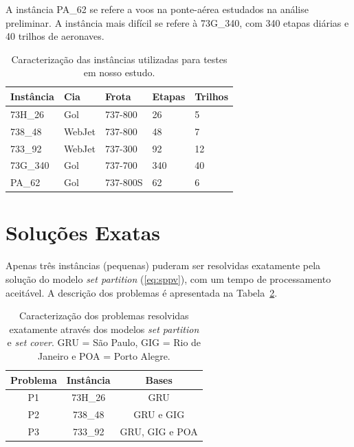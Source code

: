 A instância PA\_62 se refere a voos na ponte-aérea estudados na análise preliminar. A instância mais
difícil se refere à 73G\_340, com 340 etapas diárias e 40 trilhos de aeronaves.

\begin{table}[htb]
	\begin{center} 
		\begin{tabular}{|l|l|l|l|l|}
			\hline 
			{\bf Instância} & {\bf Cia} & {\bf Frota} & {\bf Etapas} & {\bf Trilhos} \\ 
			\hline \hline
			73H\_26 & Gol & 737-800 & 26 & 5 \\ 
			738\_48 & WebJet & 737-800 & 48 & 7 \\ 
			733\_92 & WebJet & 737-300 & 92 & 12 \\
			73G\_340 & Gol & 737-700 & 340 & 40 \\
			PA\_62 & Gol & 737-800S & 62 & 6 \\ \hline
		\end{tabular}
		\caption{Caracterização das instâncias utilizadas para testes em nosso estudo.}
		\label{tab:instancias}
	\end{center}
\end{table}


\section{Soluções Exatas}
\label{sec:solucoes_exatas}

Apenas três instâncias (pequenas) puderam ser resolvidas exatamente pela solução do modelo {\it set
partition} (\ref{eq:sppv}), com um tempo de processamento aceitável. A descrição dos problemas é
apresentada na Tabela~\ref{tab:problemas}.

\begin{table}[htb]
	\begin{center} 
		\begin{tabular}{|c|c|c|}
			\hline 
			{\bf Problema} & {\bf Instância} & {\bf Bases} \\ 
			\hline \hline
			P1 & 73H\_26 & GRU \\ 
			P2 & 738\_48 & GRU e GIG \\ 
			P3 & 733\_92 & GRU, GIG e POA \\ \hline
		\end{tabular}
		\caption{Caracterização dos problemas resolvidas exatamente através dos modelos 
		{\it set partition} e {\it set cover}. GRU = São Paulo, GIG = Rio de Janeiro e POA = Porto
    Alegre.}
		\label{tab:problemas}
	\end{center}
\end{table}

